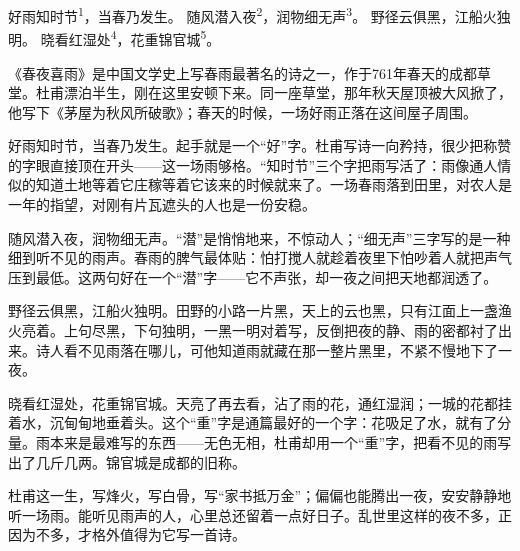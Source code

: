 
\begin{poem}
好雨知时节\textsuperscript{1}，当春乃发生。
随风潜入夜\textsuperscript{2}，润物细无声\textsuperscript{3}。
野径云俱黑，江船火独明。
晓看红湿处\textsuperscript{4}，花重锦官城\textsuperscript{5}。
\end{poem}

\begin{annotations}
\end{annotations}

\begin{appreciation}
《春夜喜雨》是中国文学史上写春雨最著名的诗之一，作于761年春天的成都草堂。杜甫漂泊半生，刚在这里安顿下来。同一座草堂，那年秋天屋顶被大风掀了，他写下《茅屋为秋风所破歌》；春天的时候，一场好雨正落在这间屋子周围。

好雨知时节，当春乃发生。起手就是一个“好”字。杜甫写诗一向矜持，很少把称赞的字眼直接顶在开头——这一场雨够格。“知时节”三个字把雨写活了：雨像通人情似的知道土地等着它庄稼等着它该来的时候就来了。一场春雨落到田里，对农人是一年的指望，对刚有片瓦遮头的人也是一份安稳。

随风潜入夜，润物细无声。“潜”是悄悄地来，不惊动人；“细无声”三字写的是一种细到听不见的雨声。春雨的脾气最体贴：怕打搅人就趁着夜里下怕吵着人就把声气压到最低。这两句好在一个“潜”字——它不声张，却一夜之间把天地都润透了。

野径云俱黑，江船火独明。田野的小路一片黑，天上的云也黑，只有江面上一盏渔火亮着。上句尽黑，下句独明，一黑一明对着写，反倒把夜的静、雨的密都衬了出来。诗人看不见雨落在哪儿，可他知道雨就藏在那一整片黑里，不紧不慢地下了一夜。

晓看红湿处，花重锦官城。天亮了再去看，沾了雨的花，通红湿润；一城的花都挂着水，沉甸甸地垂着头。这个“重”字是通篇最好的一个字：花吸足了水，就有了分量。雨本来是最难写的东西——无色无相，杜甫却用一个“重”字，把看不见的雨写出了几斤几两。锦官城是成都的旧称。

杜甫这一生，写烽火，写白骨，写“家书抵万金”；偏偏也能腾出一夜，安安静静地听一场雨。能听见雨声的人，心里总还留着一点好日子。乱世里这样的夜不多，正因为不多，才格外值得为它写一首诗。
\end{appreciation}
